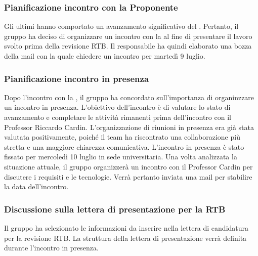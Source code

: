 \subsubsection{Pianificazione incontro con la Proponente}
\par Gli ultimi  hanno comportato un avanzamento significativo del . 
Pertanto, il gruppo ha deciso di organizzare un incontro con la  al fine di presentare il lavoro svolto prima della revisione RTB. 
Il responsabile ha quindi elaborato una bozza della mail con la quale chiedere un incontro per martedì 9 luglio.

\subsubsection{Pianificazione incontro in presenza}
\par Dopo l'incontro con la , il gruppo ha concordato sull'importanza di organinzzare un incontro in presenza. L'obiettivo dell'incontro è di valutare lo stato di avanzamento e completare le attività rimanenti prima dell'incontro con il Professor Riccardo Cardin. L'organizzazione di riunioni in presenza era già stata valutata positivamente, poiché il team ha riscontrato una collaborazione più stretta e una maggiore chiarezza comunicativa.  
L'incontro in presenza è stato fissato per mercoledì 10 luglio in sede universitaria. Una volta analizzata la situazione attuale, il gruppo organizzerà un incontro con il Professor Cardin per discutere i requisiti e le tecnologie. Verrà pertanto inviata una mail per stabilire la data dell'incontro.

\subsubsection{Discussione sulla lettera di presentazione per la RTB}
\par Il gruppo ha selezionato le informazioni da inserire nella lettera di candidatura per la revisione RTB. La struttura della lettera di presentazione verrà definita durante l'incontro in presenza.
